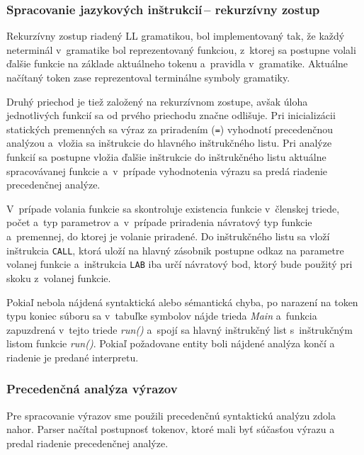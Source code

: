 \documentclass[11pt,a4paper]{article}
\begin{document}
        \subsubsection{Spracovanie jazykových inštrukcií\,-- rekurzívny zostup}
        \label{rekurzia}
        Rekurzívny zostup riadený LL gramatikou, bol implementovaný tak, že každý
        neterminál v~gramatike bol reprezentovaný funkciou, z~ktorej sa postupne
        volali ďalšie funkcie na základe aktuálneho tokenu a~pravidla v~gramatike.
        Aktuálne načítaný token zase reprezentoval terminálne symboly gramatiky.

        Druhý priechod je tiež založený na rekurzívnom zostupe, avšak úloha
        jednotlivých funkcií sa od prvého priechodu značne odlišuje.
        Pri inicializácii statických premenných sa výraz za priradením (\texttt{=})
        vyhodnotí precedenčnou analýzou a~vložia sa inštrukcie do hlavného
        inštrukčného listu. Pri analýze funkcií sa postupne vložia ďalšie inštrukcie
        do inštrukčného listu aktuálne spracovávanej funkcie a~v~prípade vyhodnotenia
        výrazu  sa predá riadenie precedenčnej analýze.

        V~prípade volania funkcie sa skontroluje existencia funkcie v~členskej
        triede, počet a~typ parametrov a~v~prípade priradenia  návratový typ
        funkcie a~premennej, do ktorej je volanie priradené. Do inštrukčného
        listu sa vloží inštrukcia \texttt{CALL}, ktorá uloží na hlavný zásobnik
        postupne odkaz na parametre volanej funkcie a~inštrukcia \texttt{LAB}
        iba určí návratový bod, ktorý bude použitý pri skoku z~volanej funkcie.

        Pokiaľ nebola nájdená syntaktická alebo sémantická chyba, po narazení na
        token typu koniec súboru sa v~tabuľke symbolov nájde trieda \emph{Main}
        a~funkcia zapuzdrená v~tejto triede \emph{run()} a~spojí sa hlavný inštrukčný
        list s~inštrukčným listom funkcie \emph{run()}. Pokiaľ požadovane entity
        boli nájdené analýza končí a riadenie je predané interpretu.

        \subsubsection{Precedenčná analýza výrazov}
        \label{precedencna analyza}

        Pre spracovanie výrazov sme použili precedenčnú syntaktickú analýzu zdola nahor.
        Parser načítal postupnosť tokenov, ktoré mali byť súčasťou výrazu a predal
        riadenie precedenčnej analýze.
\end{document}
